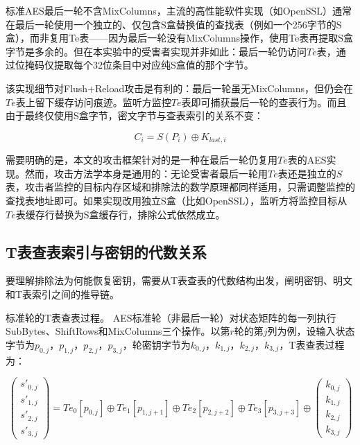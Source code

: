 标准AES最后一轮不含MixColumns，主流的高性能软件实现（如OpenSSL）通常在最后一轮使用一个独立的、仅包含S盒替换值的查找表（例如一个256字节的S盒），而非复用Te表——因为最后一轮没有MixColumns操作，使用Te表再提取S盒字节是多余的。但在本实验中的受害者实现并非如此：最后一轮仍访问$Te$表，通过位掩码仅提取每个32位条目中对应纯S盒值的那个字节。

该实现细节对Flush+Reload攻击是有利的：最后一轮虽无MixColumns，但仍会在$Te$表上留下缓存访问痕迹。监听方监控$Te$表即可捕获最后一轮的查表行为。而且由于最终仅使用S盒字节，密文字节与查表索引的关系不变：

\begin{equation}
C_i = S(P_i) \oplus K_{last,i}
\end{equation}

需要明确的是，本文的攻击框架针对的是一种在最后一轮仍复用$Te$表的AES实现。然而，攻击方法学本身是通用的：无论受害者最后一轮用$Te$表还是独立的$S$表，攻击者监控的目标内存区域和排除法的数学原理都同样适用，只需调整监控的查找表地址即可。如果实现改用独立S盒（比如OpenSSL），监听方将监控目标从$Te$表缓存行替换为S盒缓存行，排除公式依然成立。

\subsection{T表查表索引与密钥的代数关系}

要理解排除法为何能恢复密钥，需要从T表查表的代数结构出发，阐明密钥、明文和T表索引之间的推导链。

标准轮的T表查表过程。
AES标准轮（非最后一轮）对状态矩阵的每一列执行SubBytes、ShiftRows和MixColumns三个操作。以第$r$轮的第$j$列为例，设输入状态字节为$p_{0,j}$，$p_{1,j}$，$p_{2,j}$，$p_{3,j}$，轮密钥字节为$k_{0,j}$，$k_{1,j}$，$k_{2,j}$，$k_{3,j}$，T表查表过程为：

\begin{equation}
\begin{pmatrix} s'_{0,j} \\ s'_{1,j} \\ s'_{2,j} \\ s'_{3,j} \end{pmatrix} = Te_0[p_{0,j}] \oplus Te_1[p_{1,j+1}] \oplus Te_2[p_{2,j+2}] \oplus Te_3[p_{3,j+3}] \oplus \begin{pmatrix} k_{0,j} \\ k_{1,j} \\ k_{2,j} \\ k_{3,j} \end{pmatrix}
\end{equation}

